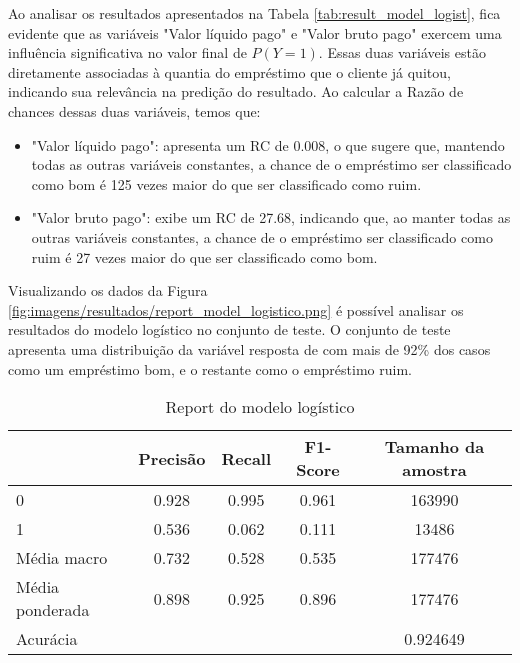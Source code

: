 Ao analisar os resultados apresentados na Tabela \ref{tab:result_model_logist}, fica evidente
que as variáveis "Valor líquido pago" e "Valor bruto pago" exercem uma influência significativa no valor final de $P(Y=1)$.
Essas duas variáveis estão diretamente associadas à quantia do empréstimo que o cliente já quitou, 
indicando sua relevância na predição do resultado. Ao calcular a Razão de chances dessas duas variáveis, temos que:


\begin{itemize}
  \item "Valor líquido pago": apresenta um RC de 0.008, o que sugere que, mantendo todas as outras variáveis constantes, a chance de o empréstimo ser classificado como bom é 125 vezes maior do que ser classificado como ruim.
  \item "Valor bruto pago": exibe um RC de 27.68, indicando que, ao manter todas as outras variáveis constantes, a chance de o empréstimo ser classificado como ruim é 27 vezes maior do que ser classificado como bom.
\end{itemize}



Visualizando os dados da Figura \ref{fig:imagens/resultados/report_model_logistico.png} é possível analisar 
os resultados do modelo logístico no conjunto de teste. O conjunto de teste apresenta uma distribuição da variável 
resposta de com mais de 92\% dos casos como um empréstimo bom, e o restante como o empréstimo ruim.


\begin{table}[H]
\centering
\begin{tabular}{lcccc}
  \hline
                &    \textbf{Precisão} & \textbf{Recall}    &   \textbf{F1-Score} &  \textbf{Tamanho da amostra} \\
  \hline
   0               &    0.928 & 0.995  &   0.961 & 163990        \\
   1               &    0.536 & 0.062 &   0.111 & 13486        \\
   Média macro     &    0.732 & 0.528  &   0.535 & 177476        \\
   Média ponderada &    0.898 & 0.925  &   0.896 & 177476        \\
   \hline
   Acurácia     &             &           &    &  0.924649\\

  \hline
\end{tabular}
\caption{Report do modelo logístico}
\label{tab:report_logist_model}
\end{table}



